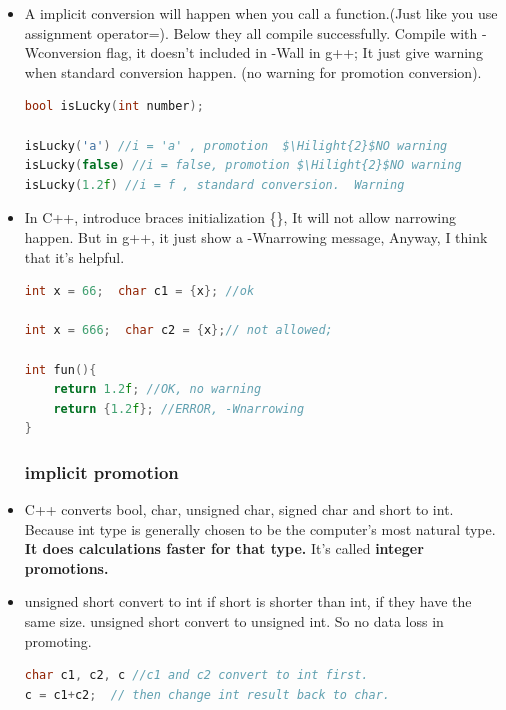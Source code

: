 \documentclass[a4paper,12pt,twoside]{book}
\newcommand{\Hilight}[1]{\makebox[0pt][l]{\color{yellow}\rule[-3pt]{#1em}{11pt}}}
\begin{document}
\begin{itemize}
\begin{lstlisting}[frame=single, language=c++]
int i, float f;
i=f;
//1) fragment will be lost,  f= 3.99, i will be 3 (not rounding)
//2) If f is too big.  undefined behave

f = i;
// 1) will lost precision if i is big.
\end{lstlisting}
	
\item A implicit conversion will happen when you call a function.(Just like you use assignment operator=). Below they all compile successfully. Compile with -Wconversion flag, it doesn't included in -Wall in g++; It just give warning when standard conversion happen. (no warning for promotion conversion).
\begin{lstlisting}[frame=single, language=c++]
bool isLucky(int number);
	
isLucky('a') //i = 'a' , promotion  $\Hilight{2}$NO warning
isLucky(false) //i = false, promotion $\Hilight{2}$NO warning
isLucky(1.2f) //i = f , standard conversion.  Warning
\end{lstlisting}
	

	
	\item In C++, introduce braces initialization \{\}, It will not allow narrowing happen. But in g++, it just show a -Wnarrowing message, Anyway, I think that it's helpful.
\begin{lstlisting}[frame=single, language=c++]
int x = 66;  char c1 = {x}; //ok

int x = 666;  char c2 = {x};// not allowed;

int fun(){
	return 1.2f; //OK, no warning
	return {1.2f}; //ERROR, -Wnarrowing
}
\end{lstlisting}
	
	\subsubsection{implicit promotion}
	\item C++ converts bool, char, unsigned char, signed char and short to int. Because int type is generally chosen to be the computer's most natural type. \textbf{It does calculations faster for that type.} It's called \textbf{integer promotions.}
	
	\item unsigned short convert to int if short is shorter than int, if they have the same size. unsigned short convert to unsigned int.  So no data loss in promoting.
\begin{lstlisting}[frame=single, language=c++, mathescape=true]
char c1, c2, c //c1 and c2 convert to int first.
c = c1+c2;  // then change int result back to char.


\end{lstlisting}
\end{itemize}
\end{document}
